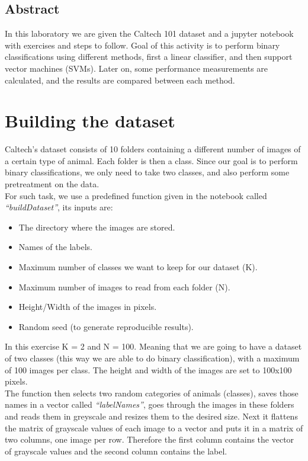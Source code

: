 \documentclass{thesisreport}
\begin{document}


   
 
  \section*{Abstract}
In this laboratory we are given the Caltech 101 dataset and a jupyter notebook with exercises and steps to follow. Goal of this activity is to perform binary classifications using different methods, first a linear classifier, and then support vector machines (SVMs). Later on, some performance measurements are calculated, and the results are compared between each method.
 \newpage
 \newpage
 \listoffigures
\listoftables
\tableofcontents
 


\chapter{Building the dataset}

 Caltech’s dataset consists of 10 folders containing a different number of images of a certain type of animal. Each folder is then a class. Since our goal is to perform binary classifications, we only need to take two classes, and also perform some pretreatment on the data.\\
For such task, we use a predefined function given in the notebook called \textit{“buildDataset”}, its inputs are:\\

\begin{itemize}
\item The directory where the images are stored. 
\item Names of the labels.
\item Maximum number of classes we want to keep for our dataset (K).
\item Maximum number of images to read from each folder (N).
\item Height/Width of the images in pixels. 
\item Random seed (to generate reproducible results).
\end{itemize}

In this exercise K = 2 and N = 100.  Meaning that we are going to have a dataset of two classes (this way we are able to do binary classification), with a maximum of 100 images per class. The height and width of the images are set to 100x100 pixels.\\
The function then selects two random categories of animals (classes), saves those names in a vector called \textit{“labelNames”}, goes through the images in these folders and reads them in greyscale and resizes them to the desired size. Next it flattens the matrix of grayscale values of each image to a vector and puts it in a matrix of two columns, one image per row. Therefore the first column contains the vector of grayscale values and the second column contains the label.\\
\end{document}
